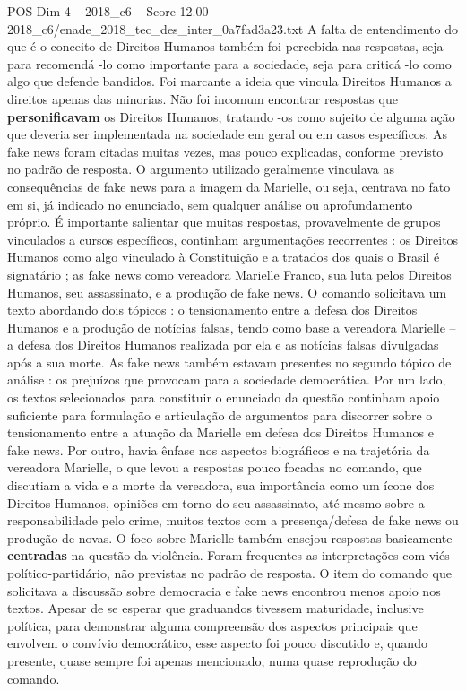 \begin{textsample}{POS Dim 4 – 2018\_c6 – Score 12.00 – 2018\_c6/enade\_2018\_tec\_des\_inter\_0a7fad3a23.txt}
A falta de entendimento do que é o conceito de Direitos Humanos também foi percebida nas respostas, seja para recomendá -lo como importante para a sociedade, seja para criticá -lo como algo que defende bandidos.
Foi marcante a ideia que vincula Direitos Humanos a direitos apenas das minorias.
Não foi incomum encontrar respostas que \textbf{personificavam} os Direitos Humanos, tratando -os como sujeito de alguma ação que deveria ser implementada na sociedade em geral ou em casos específicos.
As fake news foram citadas muitas vezes, mas pouco explicadas, conforme previsto no padrão de resposta.
O argumento utilizado geralmente vinculava as consequências de fake news para a imagem da Marielle, ou seja, centrava no fato em si, já indicado no enunciado, sem qualquer análise ou aprofundamento próprio.
É importante salientar que muitas respostas, provavelmente de grupos vinculados a cursos específicos, continham argumentações recorrentes : os Direitos Humanos como algo vinculado à Constituição e a tratados dos quais o Brasil é signatário ; as fake news como vereadora Marielle Franco, sua luta pelos Direitos Humanos, seu assassinato, e a produção de fake news.
O comando solicitava um texto abordando dois tópicos : o tensionamento entre a defesa dos Direitos Humanos e a produção de notícias falsas, tendo como base a vereadora Marielle – a defesa dos Direitos Humanos realizada por ela e as notícias falsas divulgadas após a sua morte.
As fake news também estavam presentes no segundo tópico de análise : os prejuízos que provocam para a sociedade democrática.
Por um lado, os textos selecionados para constituir o enunciado da questão continham apoio suficiente para formulação e articulação de argumentos para discorrer sobre o tensionamento entre a atuação da Marielle em defesa dos Direitos Humanos e fake news.
Por outro, havia ênfase nos aspectos biográficos e na trajetória da vereadora Marielle, o que levou a respostas pouco focadas no comando, que discutiam a vida e a morte da vereadora, sua importância como um ícone dos Direitos Humanos, opiniões em torno do seu assassinato, até mesmo sobre a responsabilidade pelo crime, muitos textos com a presença/defesa de fake news ou produção de novas.
O foco sobre Marielle também ensejou respostas basicamente \textbf{centradas} na questão da violência.
Foram frequentes as interpretações com viés político-partidário, não previstas no padrão de resposta.
O item do comando que solicitava a discussão sobre democracia e fake news encontrou menos apoio nos textos.
Apesar de se esperar que graduandos tivessem maturidade, inclusive política, para demonstrar alguma compreensão dos aspectos principais que envolvem o convívio democrático, esse aspecto foi pouco discutido e, quando presente, quase sempre foi apenas mencionado, numa quase reprodução do comando.

\end{textsample}
